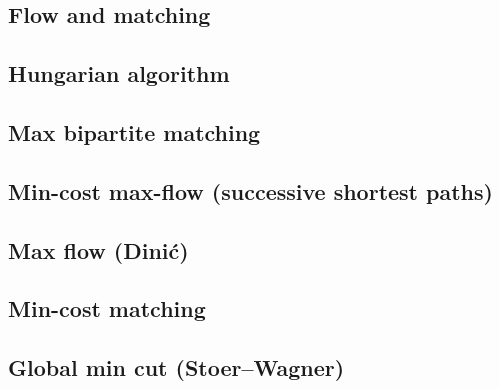 \documentclass[9pt]{extarticle}
\begin{document}
\begin{multicols*}{3}
\setlength{\parskip}{0.0in}
\tableofcontents
\setlength{\parskip}{0.1in}
\section{Flow and matching}

\subsection{Hungarian algorithm} %


\subsection{Max bipartite matching} %


\subsection{Min-cost max-flow (successive shortest paths)}


\subsection{Max flow (Dini\'c)} %


\subsection{Min-cost matching} %


\subsection{Global min cut (Stoer--Wagner)} %



\end{multicols*}
\end{document}
